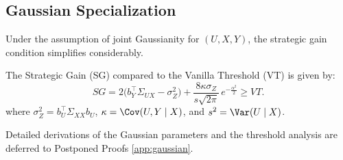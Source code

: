 \subsection{Gaussian Specialization}
Under the assumption of joint Gaussianity for $(U, X, Y)$, the strategic gain condition simplifies considerably.

\begin{theorem}
The Strategic Gain (SG) compared to the Vanilla Threshold (VT) is given by:
\begin{equation}
  SG = 2\bigl(b_Y^\top\Sigma_{UX}-\sigma_Z^2\bigr) + \frac{8\kappa\sigma_Z}{s\sqrt{2\pi}}\, e^{-\frac{\alpha^2}{2}} \ge VT.
\end{equation}
where $\sigma_Z^2 = b_U^\top \Sigma_{XX} b_U$, $\kappa = \Cov(U,Y \mid X)$, and $s^2 = \Var(U \mid X)$. 
\end{theorem}

Detailed derivations of the Gaussian parameters and the threshold analysis are deferred to Postponed Proofs \ref{app:gaussian}.
